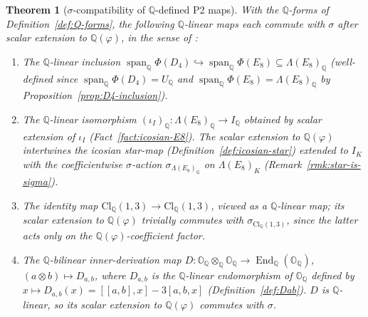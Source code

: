 \documentclass[11pt, a4paper]{amsart}
\newtheorem{theorem}{Theorem}[section]
\theoremstyle{definition}
\newcommand{\Q}{\mathbb{Q}}
\newcommand{\OO}{\mathbb{O}}
\newcommand{\Cl}{\mathrm{Cl}}
\begin{document}
\begin{theorem}[$\sigma$-compatibility of $\Q$-defined P2 maps]
\label{thm:sigma-compat-P2}
With the $\Q$-forms of Definition~\ref{def:Q-forms}, the following
$\Q$-linear maps each commute with $\sigma$ after scalar extension
to $\Q(\varphi)$, in the sense of
\cite[Thm.~4.5]{SigmaRationality}:
\begin{enumerate}
\item The $\Q$-linear inclusion
  $\operatorname{span}_\Q \Phi(D_4) \hookrightarrow
  \operatorname{span}_\Q \Phi(E_8) \subseteq \Lambda(E_8)_\Q$
  (well-defined since $\operatorname{span}_\Q \Phi(D_4) = U_\Q$
  and $\operatorname{span}_\Q \Phi(E_8) = \Lambda(E_8)_\Q$ by
  Proposition~\ref{prop:D4-inclusion}).
\item The $\Q$-linear isomorphism
  $(\iota_I)_\Q \colon \Lambda(E_8)_\Q \to I_\Q$ obtained by
  scalar extension of $\iota_I$
  (Fact~\ref{fact:icosian-E8}). The scalar extension to
  $\Q(\varphi)$ intertwines the icosian star-map
  (Definition~\ref{def:icosian-star}) extended to $I_K$ with the
  coefficientwise $\sigma$-action $\sigma_{\Lambda(E_8)_\Q}$ on
  $\Lambda(E_8)_K$ (Remark~\ref{rmk:star-is-sigma}).
\item The identity map $\Cl_\Q(1,3) \to \Cl_\Q(1,3)$, viewed as a
  $\Q$-linear map; its scalar extension to $\Q(\varphi)$ trivially
  commutes with $\sigma_{\Cl_\Q(1,3)}$, since the latter acts only
  on the $\Q(\varphi)$-coefficient factor.
\item The $\Q$-bilinear inner-derivation map
  $D \colon \OO_\Q \otimes_\Q \OO_\Q \to \operatorname{End}_\Q(\OO_\Q)$,
  $(a \otimes b) \mapsto D_{a, b}$, where $D_{a, b}$ is the
  $\Q$-linear endomorphism of $\OO_\Q$ defined by $x \mapsto
  D_{a,b}(x) = [[a,b], x] - 3[a, b, x]$
  (Definition~\ref{def:Dab}). $D$ is $\Q$-linear, so its scalar
  extension to $\Q(\varphi)$ commutes with $\sigma$.
\end{enumerate}
\end{theorem}
\end{document}

